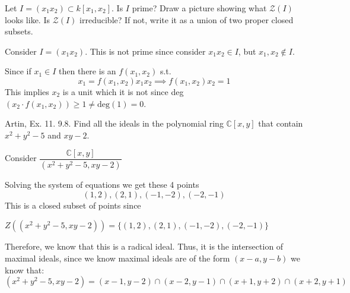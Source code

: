 \documentclass[12pt, letterpaper]{article}
\newcommand{\C}{\mathbb{C}}
\renewcommand{\t}[1]{\text{#1}}
\begin{document}
\begin{subproblem}{}
    Let $I= (x_1 x_2) \subset k[x_1,x_2]$.  Is $I$ prime? Draw a picture showing what $\mathcal{Z} (I)$ looks like.  Is $\mathcal{Z} (I)$ irreducible? If not, write it as a union of two proper closed subsets. 
\end{subproblem}
\begin{problemproof}
    Consider $I=(x_1x_2)$. This is not prime since consider $x_1x_2 \in I$, but $x_1,x_2 \notin I$.
    
    Since if $x_1 \in I$ then there is an $f(x_1,x_2)$ s.t.
    \[x_1 = f(x_1,x_2)x_1x_2 \implies f(x_1,x_2)x_2=1\]
    This implies $x_2$ is a unit which it is not since deg$(x_2 \cdot f(x_1,x_2)) \geq 1 \neq \t{deg}(1)=0$.
\end{problemproof}

\qh
\begin{subproblem}{}
    Artin, Ex. 11. 9.8.  Find all the ideals in the polynomial ring $\C [x,y] $ that contain $x^2 + y^2 -5$ and $xy -2$.
\end{subproblem}

Consider $\dfrac{\C[x,y]}{(x^2+y^2-5,xy-2)}$

Solving the system of equations we get these 4 points
\[(1,2), (2,1), (-1,-2), (-2,-1)\]
This is a closed subset of points since 

$Z((x^2+y^2-5,xy-2))=\{(1,2),(2,1),(-1,-2),(-2,-1)\}$

Therefore, we know that this is a radical ideal. Thus, it is the intersection of maximal ideals, since we know maximal ideals are of the form $(x-a,y-b)$ we know that:
\[(x^2+y^2-5,xy-2)=(x-1,y-2) \cap (x-2,y-1) \cap (x+1,y+2) \cap (x+2,y+1)\]
\end{document}
